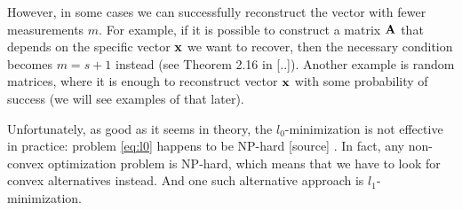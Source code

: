 \begin{remark}
    However, in some cases we can successfully reconstruct the vector with fewer measurements $m$.
    For example, if it is possible to construct a matrix $\mathbf{A}$ that depends on the specific vector $\mathbf{x}$ we want to recover,
    then the necessary condition becomes $m=s+1$ instead (see Theorem 2.16 in [..]).
    Another example is random matrices, where it is enough to reconstruct vector $\mathbf{x}$ with some probability of success (we will see examples of that later).
\end{remark}


Unfortunately, as good as it seems in theory, the $l_0$-minimization is not effective in practice: problem \ref{eq:l0} happens to be NP-hard [source]
.
In fact, any non-convex optimization problem is NP-hard, which means that we have to look for convex alternatives instead.
And one such alternative approach is $l_1$-minimization.